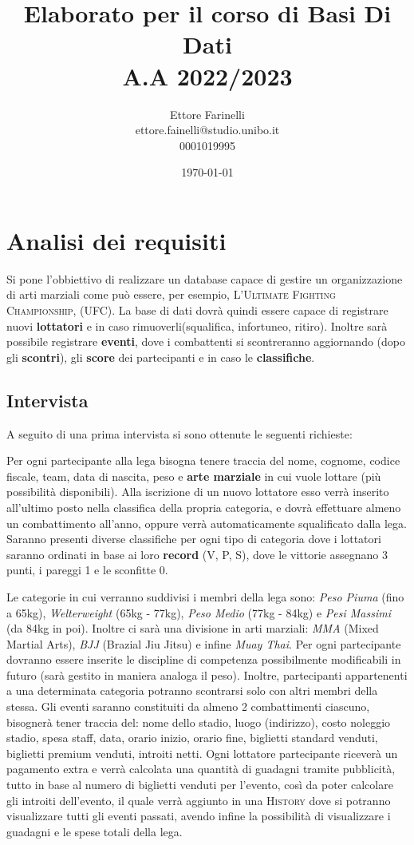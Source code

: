 \documentclass[a4paper,12pt]{report}
\title{\textbf{Elaborato per il corso di Basi Di Dati \\ A.A 2022/2023}}
\author{Ettore Farinelli \\ ettore.fainelli@studio.unibo.it \\ 0001019995}
\date{\today}
\begin{document}
\maketitle

\tableofcontents

\chapter{Analisi dei requisiti}
Si pone l'obbiettivo di realizzare un database capace di gestire un organizzazione di arti marziali come può essere, 
per esempio, \textsc{L'Ultimate Fighting Championship, (UFC)}. La base di dati dovrà quindi essere capace di registrare 
nuovi \textbf{lottatori} e in caso rimuoverli(squalifica, infortuneo, ritiro). Inoltre sarà possibile registrare \textbf{eventi}, 
dove i combattenti si scontreranno aggiornando (dopo gli \textbf{scontri}), gli \textbf{score} dei partecipanti 
e in caso le \textbf{classifiche}.

\section{Intervista}
A seguito di una prima intervista si sono ottenute le seguenti richieste:\medskip

Per ogni partecipante alla lega bisogna tenere traccia del nome, cognome, codice fiscale, team, data di nascita, peso e \textbf{arte 
marziale} in cui vuole lottare (più possibilità disponibili). Alla iscrizione di un nuovo lottatore esso verrà inserito all'ultimo 
posto nella classifica della propria categoria, e dovrà effettuare almeno un combattimento all'anno, oppure verrà automaticamente 
squalificato dalla lega. Saranno presenti diverse classifiche per ogni tipo di categoria dove i lottatori saranno ordinati 
in base ai loro \textbf{record} (V, P, S), dove le vittorie assegnano 3 punti, i pareggi 1 e le sconfitte 0.\par
Le categorie in cui verranno suddivisi i membri della lega sono: \textit{Peso Piuma} (fino a 65kg), \textit{Welterweight} 
(65kg - 77kg), \textit{Peso Medio} (77kg - 84kg) e \textit{Pesi Massimi} (da 84kg in poi). Inoltre ci sarà una divisione in 
arti marziali: \textit{MMA} (Mixed Martial Arts), \textit{BJJ} (Brazial Jiu Jitsu) e infine \textit{Muay Thai}. Per ogni 
partecipante dovranno essere inserite le discipline di competenza possibilmente modificabili in futuro (sarà gestito in maniera 
analoga il peso). Inoltre, partecipanti appartenenti a una determinata categoria potranno scontrarsi solo con altri membri 
della stessa. Gli eventi saranno constituiti da almeno 2 combattimenti ciascuno, bisognerà tener traccia del: nome dello stadio, 
luogo (indirizzo), costo noleggio stadio, spesa staff, data, orario inizio, orario fine, biglietti standard venduti, biglietti 
premium venduti, introiti netti. Ogni lottatore partecipante riceverà un pagamento extra e verrà calcolata una quantità di guadagni 
tramite pubblicità, tutto in base al numero di biglietti venduti per l'evento, così da poter calcolare gli introiti dell'evento, 
il quale verrà aggiunto in una \textsc{History} dove si potranno visualizzare tutti gli eventi passati, 
avendo infine la possibilità di visualizzare i guadagni e le spese totali della lega.
\end{document}
